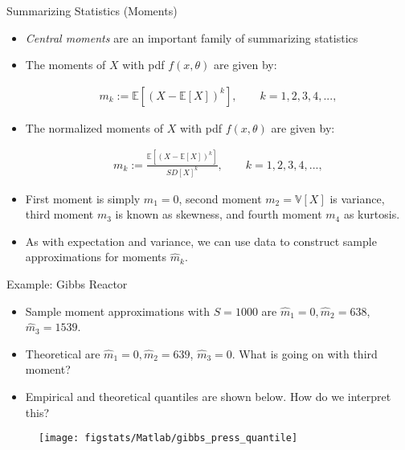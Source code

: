 \documentclass[9pt]{beamer}
\begin{document}
\begin{frame}{Summarizing Statistics (Moments)}

\begin{itemize}
\item {\em Central moments} are an important family of summarizing statistics

\item The moments of $X$ with pdf $f(x,\theta)$ are given by:
\begin{block}{}
\begin{align*}
m_k:=\mathbb{E}[(X-\mathbb{E}[X])^k], \qquad k=1,2,3,4,...,
\end{align*}
\end{block}
\item The normalized moments of $X$ with pdf $f(x,\theta)$ are given by:
\begin{block}{}
\begin{align*}
m_k:=\frac{\mathbb{E}[(X-\mathbb{E}[X])^k]}{SD[X]^k}, \qquad k=1,2,3,4,...,
\end{align*}
\end{block}

\item First moment is simply $m_1=0$, second moment $m_2=\mathbb{V}[X]$ is variance, third moment $m_3$ is known as skewness, and fourth moment  $m_4$ as kurtosis. 

\item As with expectation and variance, we can use data to construct sample approximations for moments $\hat{m}_k$. 

\end{itemize}

\end{frame}

\begin{frame}{Example: Gibbs Reactor}
\begin{itemize}
\item Sample moment approximations with $S=1000$ are $\hat{m}_1=0,\hat{m}_2=638$, $\hat{m}_3=1539$.
\item Theoretical are $\hat{m}_1=0,\hat{m}_2=639$, $\hat{m}_3=0$. What is going on with third moment?
\item Empirical and theoretical quantiles are shown below. How do we interpret this? 
\end{itemize}
\begin{figure}[!htb]
    \centering
	\texttt{[image: figstats/Matlab/gibbs\_press\_quantile]}
\end{figure}
\end{frame}
\end{document}
